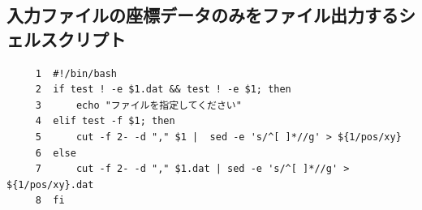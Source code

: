 \documentclass{jsarticle}
\begin{document}
\subsection{入力ファイルの座標データのみをファイル出力するシェルスクリプト}
\scriptsize
\begin{verbatim}
     1	#!/bin/bash
     2	if test ! -e $1.dat && test ! -e $1; then
     3	    echo "ファイルを指定してください"
     4	elif test -f $1; then
     5	    cut -f 2- -d "," $1 |  sed -e 's/^[ ]*//g' > ${1/pos/xy}
     6	else
     7	    cut -f 2- -d "," $1.dat | sed -e 's/^[ ]*//g' > ${1/pos/xy}.dat
     8	fi
\end{verbatim}
\normalsize



%
%
%
\end{document}
